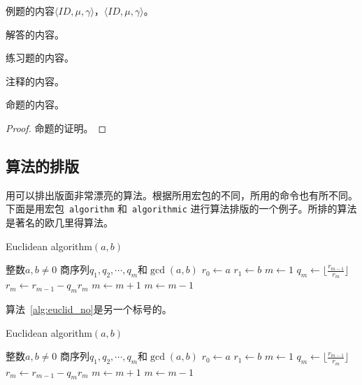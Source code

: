 \begin{example}[2010，重庆卷]
例题的内容$\langle ID,\mu,\gamma\rangle$，$\langle ID,\mu,\gamma\rangle$。
\end{example}
\begin{solution}
解答的内容。
\end{solution}
\begin{exercise}
练习题的内容。
\end{exercise}
\begin{note}
注释的内容。
\end{note}
\begin{proposition}
命题的内容。
\end{proposition}
\begin{proof}
命题的证明。
\end{proof}

\subsection{算法的排版\index{}}
用\CTeX 可以排出版面非常漂亮的算法。根据所用宏包的不同，所用的命令也有所不同。下面是用宏包~{\tt algorithm} 和~{\tt algorithmic} 进行算法排版的一个例子。所排的算法是著名的欧几里得算法。

\begin{algorithm}
\caption{Euclidean algorithm$(a,b)$}
\label{alg:euclid}
\begin{algorithmic}[1]
\REQUIRE 整数$a,b\ne 0$
\ENSURE  商序列$q_1,q_2,\cdots,q_m$和$\gcd(a,b)$
\STATE $r_0 \leftarrow a$
\STATE $r_1 \leftarrow b$
\STATE $m\leftarrow 1$
\STATE $q_m\leftarrow\lfloor\frac{r_{m-1}}{r_m}\rfloor$
\STATE $r_m\leftarrow r_{m-1}-q_mr_m$
\STATE $m\leftarrow m+1$
\ENDWHILE
\STATE $m\leftarrow m-1$
\end{algorithmic}
\end{algorithm}
算法~\ref{alg:euclid_no}是另一个标号的。
\begin{algorithm}
\caption{Euclidean algorithm$(a,b)$}
\label{alg:euclid_no}
\begin{algorithmic}[2]
\REQUIRE 整数$a,b\ne 0$
\ENSURE  商序列$q_1,q_2,\cdots,q_m$和$\gcd(a,b)$
\STATE $r_0 \leftarrow a$
\STATE $r_1 \leftarrow b$
\STATE $m\leftarrow 1$
\STATE $q_m\leftarrow\lfloor\frac{r_{m-1}}{r_m}\rfloor$
\STATE $r_m\leftarrow r_{m-1}-q_mr_m$
\STATE $m\leftarrow m+1$
\ENDWHILE
\STATE $m\leftarrow m-1$
\end{algorithmic}
\end{algorithm}

